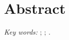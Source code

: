 % 


\chapter{Abstract} %
\noindent


\bigskip
\noindent
\textit{Key words:} ; ; .

\checklanguage
\endinput 
